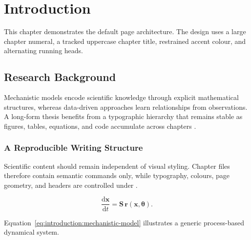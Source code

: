 \chapter{Introduction}
\label{chap:introduction}

This chapter demonstrates the default page architecture. The design uses a large chapter numeral, a tracked uppercase chapter title, restrained accent colour, and alternating running heads.

\section{Research Background}
\label{sec:introduction:background}

Mechanistic models encode scientific knowledge through explicit mathematical structures, whereas data-driven approaches learn relationships from observations. A long-form thesis benefits from a typographic hierarchy that remains stable as figures, tables, equations, and code accumulate across chapters \autocite{sample2026}.

\subsection{A Reproducible Writing Structure}

Scientific content should remain independent of visual styling. Chapter files therefore contain semantic commands only, while typography, colours, page geometry, and headers are controlled under .

\begin{equation}
  \frac{\mathrm{d}\symbf{x}}{\mathrm{d}t}
  = \symbf{S}\,\symbf{r}(\symbf{x},\symbf{\theta}).
  \label{eq:introduction:mechanistic-model}
\end{equation}

Equation~\ref{eq:introduction:mechanistic-model} illustrates a generic process-based dynamical system.

